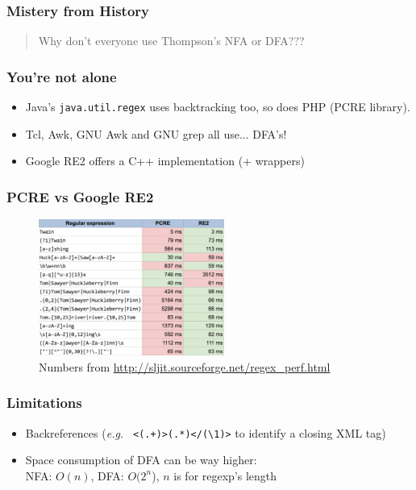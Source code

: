 \documentclass[aspectratio=169,xcolor=table]{beamer}
\newcommand{\ctexttt}[1]{\colorbox{cverbbg}{\texttt{#1}}}
\begin{document}


\begin{frame}
  \frametitle{Mistery from History}
  \begin{quotation}
    Why don't everyone use Thompson's NFA or DFA???
  \end{quotation}
\end{frame}


\begin{frame}
  \frametitle{You're not alone}
  \begin{itemize}
  \item Java's \ctexttt{java.util.regex} uses backtracking too, so does PHP
    (PCRE library).
  \item Tcl, Awk, GNU Awk and GNU grep all use... DFA's!
  \item Google RE2 offers a C++ implementation (+ wrappers)
  \end{itemize}
\end{frame}


\begin{frame}
  \frametitle{PCRE vs Google RE2}
  \begin{center}
    \begin{figure}
      \includegraphics[width=230px]{images/pcre-vs-re2.png}
      \caption{Numbers from \url{http://sljit.sourceforge.net/regex\_perf.html}}
    \end{figure}
  \end{center}
\end{frame}


\begin{frame}
  \frametitle{Limitations}
  \begin{itemize}
    \item Backreferences (\textit{e.g.} \ctexttt{
        <(.+)>(.*)</(\textbackslash1)>} to identify a closing XML tag)
    \item Space consumption of DFA can be way higher: \\ NFA: $O(n)$,
      DFA: $O(2^{n}$), $n$ is for regexp's length
  \end{itemize}
\end{frame}
\end{document}
